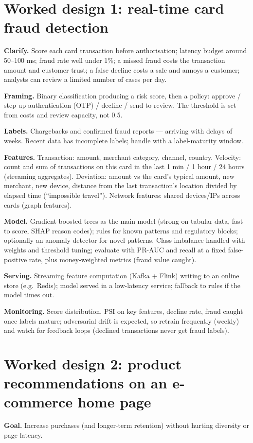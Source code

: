 \section{Worked design 1: real-time card fraud detection}
\textbf{Clarify.} Score each card transaction before authorisation; latency budget around 50--100 ms; fraud rate well under 1\%; a missed fraud costs the transaction amount and customer trust; a false decline costs a sale and annoys a customer; analysts can review a limited number of cases per day.

\textbf{Framing.} Binary classification producing a risk score, then a policy: approve / step-up authentication (OTP) / decline / send to review. The threshold is set from costs and review capacity, not 0.5.

\textbf{Labels.} Chargebacks and confirmed fraud reports --- arriving with delays of weeks. Recent data has incomplete labels; handle with a label-maturity window.

\textbf{Features.} Transaction: amount, merchant category, channel, country. Velocity: count and sum of transactions on this card in the last 1 min / 1 hour / 24 hours (streaming aggregates). Deviation: amount vs the card's typical amount, new merchant, new device, distance from the last transaction's location divided by elapsed time (``impossible travel''). Network features: shared devices/IPs across cards (graph features).

\textbf{Model.} Gradient-boosted trees as the main model (strong on tabular data, fast to score, SHAP reason codes); rules for known patterns and regulatory blocks; optionally an anomaly detector for novel patterns. Class imbalance handled with weights and threshold tuning; evaluate with PR-AUC and recall at a fixed false-positive rate, plus money-weighted metrics (fraud value caught).

\textbf{Serving.} Streaming feature computation (Kafka + Flink) writing to an online store (e.g.\ Redis); model served in a low-latency service; fallback to rules if the model times out.

\textbf{Monitoring.} Score distribution, PSI on key features, decline rate, fraud caught once labels mature; adversarial drift is expected, so retrain frequently (weekly) and watch for feedback loops (declined transactions never get fraud labels).

\section{Worked design 2: product recommendations on an e-commerce home page}
\textbf{Goal.} Increase purchases (and longer-term retention) without hurting diversity or page latency.

